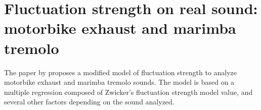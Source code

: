 \section{Fluctuation strength on real sound: motorbike exhaust and marimba
    tremolo}

The paper by \citet{Miura2013Fluctuation} proposes a modified model of
fluctuation strength to analyze motorbike exhaust and marimba tremolo sounds.
The model is based on a multiple regression composed of Zwicker's fluctuation
strength model value, and several other factors depending on the sound
analyzed.
